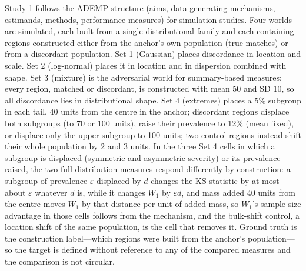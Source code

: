 \documentclass[AMA,Times1COL]{WileyNJDv5}
\begin{document}
Study 1 follows the ADEMP structure (aims, data-generating mechanisms, estimands, methods, performance measures) for simulation studies.\cite{morris2019} Four worlds are simulated, each built from a single distributional family and each containing regions constructed either from the anchor's own population (true matches) or from a discordant population. Set 1 (Gaussian) places discordance in location and scale. Set 2 (log-normal) places it in location and in dispersion combined with shape. Set 3 (mixture) is the adversarial world for summary-based measures: every region, matched or discordant, is constructed with mean 50 and SD 10, so all discordance lies in distributional shape. Set 4 (extremes) places a 5\% subgroup in each tail, 40 units from the centre in the anchor; discordant regions displace both subgroups (to 70 or 100 units), raise their prevalence to 12\% (mean fixed), or displace only the upper subgroup to 100 units; two control regions instead shift their whole population by 2 and 3 units. In the three Set 4 cells in which a subgroup is displaced (symmetric and asymmetric severity) or its prevalence raised, the two full-distribution measures respond differently by construction: a subgroup of prevalence $\varepsilon$ displaced by $d$ changes the KS statistic by at most about $\varepsilon$ whatever $d$ is, while it changes $W_1$ by $\varepsilon d$, and mass added 40 units from the centre moves $W_1$ by that distance per unit of added mass, so $W_1$'s sample-size advantage in those cells follows from the mechanism, and the bulk-shift control, a location shift of the same population, is the cell that removes it. Ground truth is the construction label---which regions were built from the anchor's population---so the target is defined without reference to any of the compared measures and the comparison is not circular.
\end{document}
